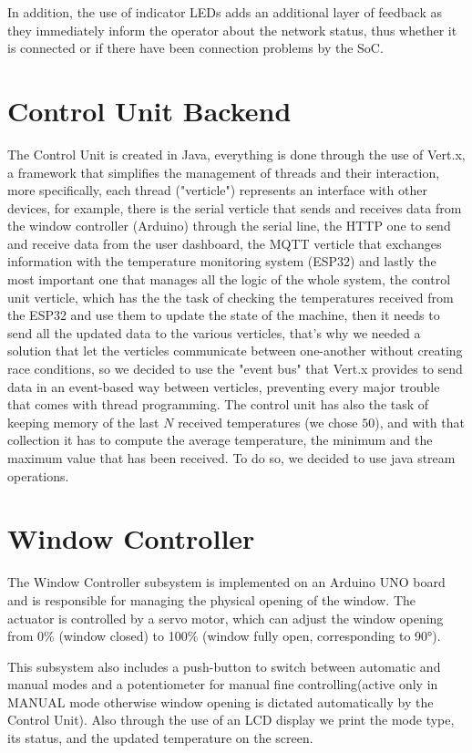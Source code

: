 \documentclass[a4paper]{article}
\begin{document}
	In addition, the use of indicator LEDs adds an additional layer of feedback as they immediately inform the operator about the network status, thus whether it is connected or if there have been connection problems by the SoC.

	\section{Control Unit Backend}
	The Control Unit is created in Java, everything is done through the use of Vert.x, a framework that simplifies the management of threads and their interaction, more specifically, each thread ("verticle") represents an interface with other devices, for example, there is the serial verticle that sends and receives data from the window controller (Arduino) through the serial line, the HTTP one to send and receive data from the user dashboard, the MQTT verticle that exchanges information with the temperature monitoring system (ESP32) and lastly the most important one that manages all the logic of the whole system, the control unit verticle, which has the the task of checking the temperatures received from the ESP32 and use them to update the state of the machine, then it needs to send all the updated data to the various verticles, that's why we needed a solution that let the verticles communicate between one-another without creating race conditions, so we decided to use the "event bus" that Vert.x provides to send data in an event-based way between verticles, preventing every major trouble that comes with thread programming. The control unit has also the task of keeping memory of the last $N$ received temperatures (we chose $50$), and with that collection it has to compute the average temperature, the minimum and the maximum value that has been received. To do so, we decided to use java stream operations.
	
	\section{Window Controller}
	The Window Controller subsystem is implemented on an Arduino UNO board and is responsible for managing the physical opening of the window. The actuator is controlled by a servo motor, which can adjust the window opening from 0\% (window closed) to 100\% (window fully open, corresponding to 90°).
	
	This subsystem also includes a push-button to switch between automatic and manual modes and a potentiometer for manual fine controlling(active only in MANUAL mode otherwise window opening is dictated automatically by the Control Unit). Also through the use of an LCD display we print the mode type, its status, and the updated temperature on the screen.
	
\end{document}
